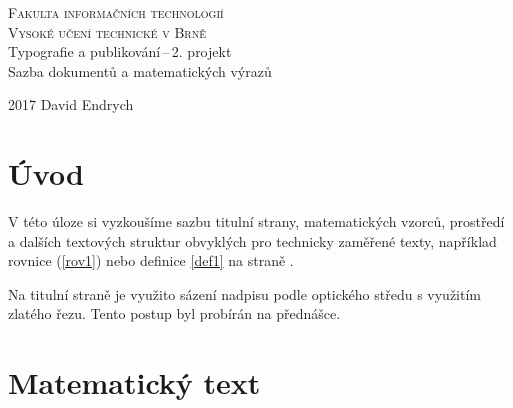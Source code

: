 \documentclass[a4paper,twocolumn,11pt]{article}
\theoremstyle{definition}
\theoremstyle{plain}
\begin{document}
\begin{titlepage}
\begin{center}
\Huge
\textsc{Fakulta informačních technologií \\ Vysoké učení technické v Brně} \\
Typografie a publikování\,--\,2. projekt \\
Sazba dokumentů a matematických výrazů 
\end{center}
{\LARGE 2017 \hfill David Endrych}
\end{titlepage}

\section*{Úvod} 
V této úloze si vyzkoušíme sazbu titulní strany, matematických vzorců, prostředí a dalších textových struktur obvyklých pro technicky zaměřené texty, například rovnice (\ref{rov1}) nebo definice \ref{def1} na straně \pageref{def1}.
\par Na titulní straně je využito sázení nadpisu podle optického středu s využitím zlatého řezu. Tento postup byl probírán na přednášce.


\section{Matematický text} 
\end{document}
